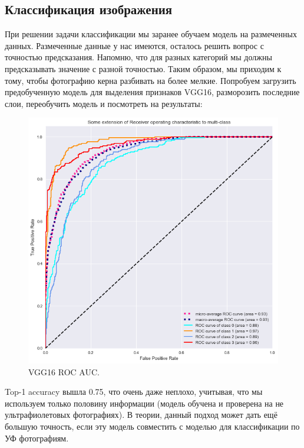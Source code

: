 \documentclass[14pt]{matmex-diploma}
\begin{document}
    \subsection{Классификация изображения}
    
        При решении задачи классификации мы заранее обучаем модель на размеченных данных. Размеченные данные у нас имеются, осталось решить вопрос с точностью предсказания. Напомню, что для разных категорий мы должны предсказывать значение с разной точностью. Таким образом, мы приходим к тому, чтобы фотографию керна разбивать на более мелкие. Попробуем загрузить предобученную модель для выделения признаков VGG16, разморозить последние слои, переобучить модель и посмотреть на результаты:
    
        \begin{figure}[h]
            \centering
            \includegraphics[scale=0.6]{images/auc.png}
            \caption{VGG16 ROC AUC.}
            \label{auc}
        \end{figure}    
        
        Top-1 accuracy вышла 0.75, что очень даже неплохо, учитывая, что мы используем только половину информации (модель обучена и проверена на не ультрафиолетовых фотографиях). В теории, данный подход может дать ещё большую точность, если эту модель совместить с моделью для классификации по УФ фотографиям.
    
\end{document}
